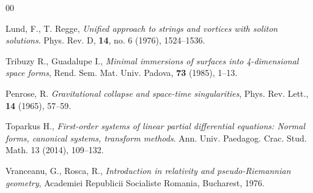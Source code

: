 \documentclass[12pt]{amsart}
\theoremstyle{definition}
\theoremstyle{remark}
\numberwithin{equation}{section}
\begin{document}
\begin{thebibliography}{00}
	
	Lund, F., T. Regge, \textit{Unified approach to strings and vortices with soliton solutions}. Phys. Rev.  D, \textbf{14}, no. 6 (1976), 1524--1536.
	
	Tribuzy R., Guadalupe I., \textit{Minimal immersions of surfaces into 4-dimensional space forms}, Rend.
	Sem. Mat. Univ. Padova, \textbf{73} (1985), 1--13.
	
	Penrose, R. \emph{Gravitational collapse and space-time
		singularities}, Phys. Rev. Lett., \textbf{14}   (1965), 57--59.
	
	
	
	  Toparkus H.,  \textit{First-order systems of linear partial differential equations: Normal forms, 
		canonical systems, transform methods}. Ann. Univ. Paedagog. Crac. Stud. Math. 13 (2014), 109--132.
	
	Vranceanu, G., Rosca, R., \emph{Introduction in relativity and
		pseudo-Riemannian geometry}, Academiei Republicii Socialiste
	Romania, Bucharest, 1976.
	
\end{thebibliography}
\end{document}
